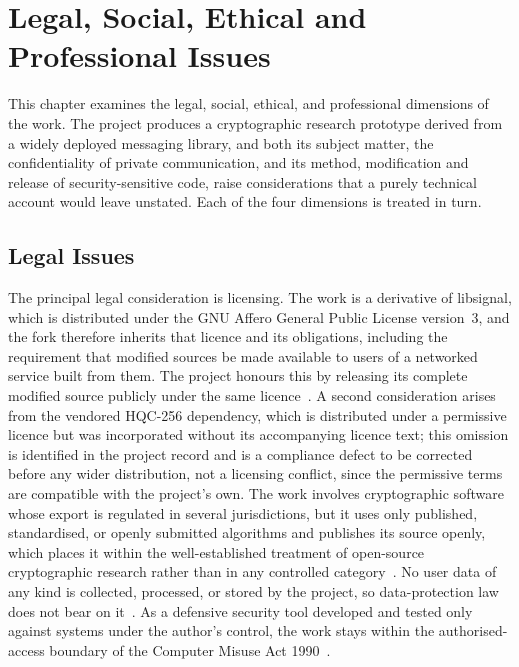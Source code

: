 \section{Legal, Social, Ethical and Professional Issues}
\label{sec:lsepi}

This chapter examines the legal, social, ethical, and professional dimensions of the work. The project produces a cryptographic research prototype derived from a widely deployed messaging library, and both its subject matter, the confidentiality of private communication, and its method, modification and release of security-sensitive code, raise considerations that a purely technical account would leave unstated. Each of the four dimensions is treated in turn.

\subsection{Legal Issues}
\label{subsec:lsepi-legal}

The principal legal consideration is licensing. The work is a derivative of libsignal, which is distributed under the GNU Affero General Public License version~3, and the fork therefore inherits that licence and its obligations, including the requirement that modified sources be made available to users of a networked service built from them. The project honours this by releasing its complete modified source publicly under the same licence~\cite{noauthor_gnu_nodate}. A second consideration arises from the vendored HQC-256 dependency, which is distributed under a permissive licence but was incorporated without its accompanying licence text; this omission is identified in the project record and is a compliance defect to be corrected before any wider distribution, not a licensing conflict, since the permissive terms are compatible with the project's own. The work involves cryptographic software whose export is regulated in several jurisdictions, but it uses only published, standardised, or openly submitted algorithms and publishes its source openly, which places it within the well-established treatment of open-source cryptographic research rather than in any controlled category~\cite{noauthor_export_2024, noauthor_notice_nodate}. No user data of any kind is collected, processed, or stored by the project, so data-protection law does not bear on it~\cite{participation_regulation_nodate}. As a defensive security tool developed and tested only against systems under the author's control, the work stays within the authorised-access boundary of the Computer Misuse Act 1990~\cite{noauthor_cma_1990}.


